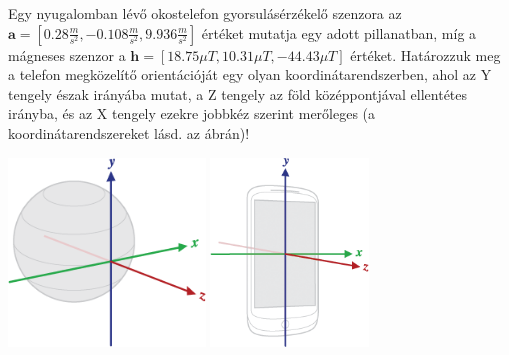 \begin{execise}
	Egy nyugalomban lévő okostelefon gyorsulásérzékelő szenzora az $\textbf{a}=\left[0.28\frac{m}{s^2},-0.108\frac{m}{s^2},9.936\frac{m}{s^2}\right]$ értéket mutatja egy adott pillanatban, míg a mágneses szenzor a $\textbf{h}=\left[18.75\mu T,10.31\mu T,-44.43\mu T\right]$ értéket. Határozzuk meg a telefon megközelítő orientációját egy olyan koordinátarendszerben, ahol az Y tengely észak irányába mutat, a Z tengely az föld középpontjával ellentétes irányba, és az X tengely ezekre jobbkéz szerint merőleges (a koordinátarendszereket lásd. az ábrán)!
	\begin{center}
		\includegraphics[height=5cm]{fig//axis_globe.png}
		\includegraphics[height=5cm]{fig//axis_device.png}
	\end{center}
\end{execise}
